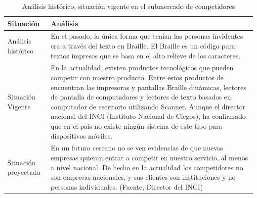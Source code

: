 \documentclass[a4paper, 12pt, oneside]{article}
\begin{document}
	\begin{table}
		\caption{Análisis histórico, situación vigente en el submercado de competidores}
		\begin{tabular}{ | p{4cm} | p{10cm} | }
		\hline
		Situación & Análisis \\
		\hline					
		Análisis histórico & 
		En el pasado, la única forma que tenían las personas invidentes era a través del texto en Braille. El Braille es un código para textos impresos que se basa en el alto relieve de los caracteres. \\
		\hline
		Situación Vigente &
		En la actualidad, existen productos tecnológicos que pueden competir con nuestro producto. Entre estos productos de encuentran las impresoras y pantallas Braille dinámicas, lectores de pantalla de computadores y lectores de texto basados en computador de escritorio utilizando Scanner. Aunque el director nacional del INCI (Instituto Nacional de Ciegos), ha confirmado que en el país no existe ningún sistema de este tipo para dispositivos móviles. \\
		\hline
		Situación proyectada &
		En un futuro cercano no se ven evidencias de que nuevas empresas quieran entrar a competir en nuestro servicio, al menos a nivel nacional. De hecho en la actualidad los competidores no son empresas nacionales, y sus clientes son instituciones y no personas individuales. (Fuente, Director del INCI)\\
		\hline
		\end{tabular}
		\label{compHistorico}
	\end{table}
	
\end{document}
